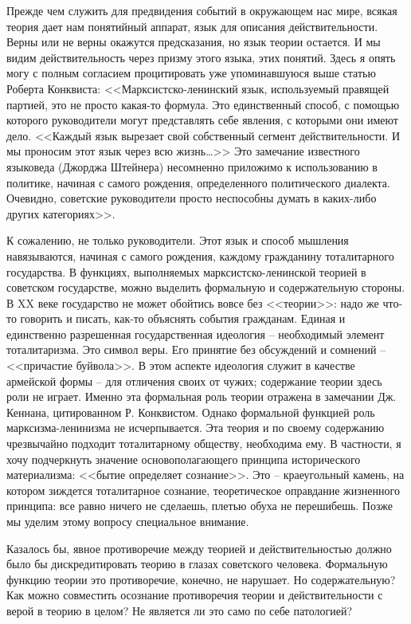 \documentclass{book}
\begin{document}
Прежде чем служить для предвидения событий в окружаю­щем нас мире, всякая теория дает нам понятийный аппарат, язык для описания 
действительности. Верны или не верны окажутся предсказания, но язык теории остается. И мы видим действительность через призму 
этого языка, этих понятий. Здесь я опять могу с полным согласием процитировать уже упоминавшуюся выше статью Роберта Конквиста:
<<Марксистско-ленинский язык, используемый правящей пар­тией, это не просто какая-то формула. Это единственный спо­соб, с помощью 
которого руководители могут представлять себе явления, с которыми они имеют дело. <<Каждый язык вырезает свой собственный сегмент 
действительности. И мы проносим этот язык через всю жизнь\ldots>> Это замечание извест­ного языковеда (Джорджа Штейнера) 
несомненно приложимо к использованию в политике, начиная с самого рождения, опре­деленного политического диалекта. Очевидно, 
советские ру­ководители просто неспособны думать в каких-либо других категориях>>.

К сожалению, не только руководители. Этот язык и способ мышления навязываются, начиная с самого рождения, каждому гражданину 
тоталитарного государства. В функциях, выполняемых марксистско-ленинской теорией в советском государстве, можно выделить 
формальную и содержательную стороны. В XX веке государство не может обойтись вовсе без <<теории>>: надо же что-то говорить и 
писать, как-то объяснять события гражданам. Единая и единственно разрешенная государственная идеология -- необходимый элемент 
тоталитаризма. Это символ веры. Его принятие без обсуждений и сомнений -- <<причастие буйвола>>. В этом аспекте идеология служит в 
качестве армейской формы -- для отличения своих от чужих; содержание теории здесь роли не играет. Именно эта формальная роль 
теории отражена в замечании Дж. Кеннана, цитированном Р. Конквистом. Однако формальной функцией роль марксизма-ленинизма не 
исчерпывается. Эта теория и по своему содержанию чрезвычайно подходит тоталитарному обществу, необходима ему. В частности, я 
хочу подчеркнуть значение основополагающего прин­ципа исторического материализма: <<бытие определяет сознание>>. Это -- 
краеугольный камень, на котором зиждется тоталитарное сознание, теоретическое оправдание жизненного принципа: все равно ничего 
не сделаешь, плетью обуха не перешибешь. Позже мы уделим этому вопросу специальное внимание.

Казалось бы, явное противоречие между теорией и действительностью должно было бы дискредитировать теорию в глазах советского 
человека. Формальную функцию теории это противоречие, конечно, не нарушает. Но содержательную? Как можно совместить осознание 
противоречия теории и действительности с верой в теорию в целом? Не является ли это само по себе патологией?
\end{document}
